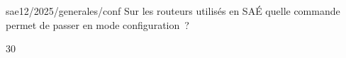 \begin{question}{sae12/2025/generales/conf}
  Sur les routeurs utilisés en SAÉ quelle commande permet de passer en
  mode configuration~?
  \begin{reponses}{3}{0}
  \end{reponses}
\end{question}

